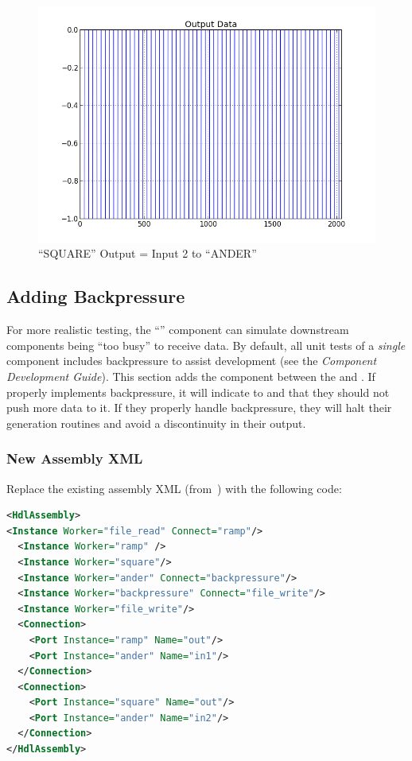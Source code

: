         \begin{figure}[H]
                \centering
                \includegraphics[scale=0.5]{./figures/square_pulse.jpg}
                \caption{``SQUARE'' Output = Input 2 to ``ANDER''}
                \label{fig:square_pulse}
        \end{figure}
\bend
\bstart
\subsection{Adding Backpressure}
For more realistic testing, the ``'' component can simulate downstream components being ``too busy'' to receive data. By default, all unit tests of a \textit{single} component includes backpressure to assist development (see the \textit{Component Development Guide}). This section adds the  component between the  and . If  properly implements backpressure, it will indicate to  and  that they should not push more data to it. If they properly handle backpressure, they will halt their generation routines and avoid a discontinuity in their output.
\subsubsection*{New Assembly XML}
Replace the existing assembly XML (from~) with the following code:
\begin{lstlisting}[language=xml]
<HdlAssembly>
<Instance Worker="file_read" Connect="ramp"/>
  <Instance Worker="ramp" />
  <Instance Worker="square"/>
  <Instance Worker="ander" Connect="backpressure"/>
  <Instance Worker="backpressure" Connect="file_write"/>
  <Instance Worker="file_write"/>
  <Connection>
    <Port Instance="ramp" Name="out"/>
    <Port Instance="ander" Name="in1"/>
  </Connection>
  <Connection>
    <Port Instance="square" Name="out"/>
    <Port Instance="ander" Name="in2"/>
  </Connection>
</HdlAssembly>
\end{lstlisting}
\bend
\bstart
